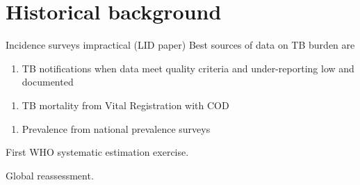 \section{Historical background}

Incidence surveys impractical (LID paper)
Best sources of data on TB burden are 
\begin{enumerate}
\item TB notifications when data meet quality criteria and under-reporting low and documented
\end{enumerate}
\begin{enumerate}
\item TB mortality from Vital Registration with COD
\end{enumerate}
\begin{enumerate}
\item Prevalence from national prevalence surveys
\end{enumerate}

First WHO systematic estimation exercise\cite{1600578}.

Global reassessment\cite{10517722}.
  
  